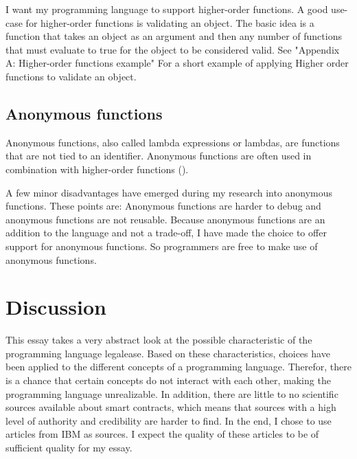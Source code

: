 \documentclass{uva-inf-article}
\begin{document}
\par I want my programming language to support higher-order functions.
A good use-case for higher-order functions is validating an object.
The basic idea is a function that takes an object as an argument and then any number of 
functions that must evaluate to true for the object to be considered valid.
See "Appendix A: Higher-order functions example" For a short example of applying 
Higher order functions to validate an object.

\subsection{Anonymous functions}
\par Anonymous functions, also called lambda expressions or lambdas, are functions that are not tied to an identifier.
Anonymous functions are often used in combination with higher-order functions (\cite{HigherOrder}).
\vspace{5mm}

\par A few minor disadvantages have emerged during my research into anonymous functions. 
These points are:
Anonymous functions are harder to debug and anonymous functions are not reusable. 
Because anonymous functions are an addition to the language and not a trade-off, 
I have made the choice to offer support for anonymous functions. 
So programmers are free to make use of anonymous functions.

\newpage

\section{Discussion}
\par This essay takes a very abstract look at the possible characteristic of the programming language legalease.
Based on these characteristics, choices have been applied to the different concepts of a programming language.
Therefor, there is a chance that certain concepts do not interact with each other, making the programming language unrealizable.
In addition, there are little to no scientific sources available about smart contracts, 
which means that sources with a high level of authority and credibility are harder to find. 
In the end, I chose to use articles from IBM as sources. 
I expect the quality of these articles to be of sufficient quality for my essay.
\end{document}
